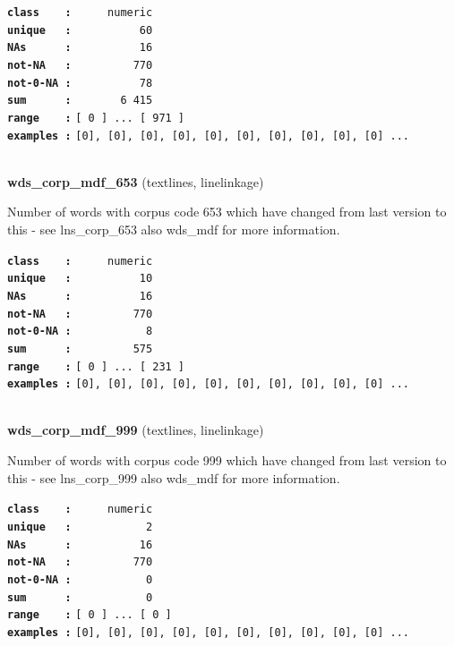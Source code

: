 \documentclass[]{article}
\begin{document}
\textbf{\texttt{class\ \ \ \ :}} \texttt{~~~~~numeric}\\
\textbf{\texttt{unique\ \ \ :}} \texttt{~~~~~~~~~~60}\\
\textbf{\texttt{NAs\ \ \ \ \ \ :}} \texttt{~~~~~~~~~~16}\\
\textbf{\texttt{not-NA\ \ \ :}} \texttt{~~~~~~~~~770}\\
\textbf{\texttt{not-0-NA\ :}} \texttt{~~~~~~~~~~78}\\
\textbf{\texttt{sum\ \ \ \ \ \ :}} \texttt{~~~~~~~6~415}\\
\textbf{\texttt{range\ \ \ \ :}}
\texttt{{[}\ 0\ {]}\ ...\ {[}\ 971\ {]}}\\
\textbf{\texttt{examples\ :}}
\texttt{{[}0{]},\ {[}0{]},\ {[}0{]},\ {[}0{]},\ {[}0{]},\ {[}0{]},\ {[}0{]},\ {[}0{]},\ {[}0{]},\ {[}0{]}\ ...}\\

~

\textbf{wds\_corp\_mdf\_653} (textlines, linelinkage)

Number of words with corpus code 653 which have changed from last
version to this - see lns\_corp\_653 also wds\_mdf for more information.

\textbf{\texttt{class\ \ \ \ :}} \texttt{~~~~~numeric}\\
\textbf{\texttt{unique\ \ \ :}} \texttt{~~~~~~~~~~10}\\
\textbf{\texttt{NAs\ \ \ \ \ \ :}} \texttt{~~~~~~~~~~16}\\
\textbf{\texttt{not-NA\ \ \ :}} \texttt{~~~~~~~~~770}\\
\textbf{\texttt{not-0-NA\ :}} \texttt{~~~~~~~~~~~8}\\
\textbf{\texttt{sum\ \ \ \ \ \ :}} \texttt{~~~~~~~~~575}\\
\textbf{\texttt{range\ \ \ \ :}}
\texttt{{[}\ 0\ {]}\ ...\ {[}\ 231\ {]}}\\
\textbf{\texttt{examples\ :}}
\texttt{{[}0{]},\ {[}0{]},\ {[}0{]},\ {[}0{]},\ {[}0{]},\ {[}0{]},\ {[}0{]},\ {[}0{]},\ {[}0{]},\ {[}0{]}\ ...}\\

~

\textbf{wds\_corp\_mdf\_999} (textlines, linelinkage)

Number of words with corpus code 999 which have changed from last
version to this - see lns\_corp\_999 also wds\_mdf for more information.

\textbf{\texttt{class\ \ \ \ :}} \texttt{~~~~~numeric}\\
\textbf{\texttt{unique\ \ \ :}} \texttt{~~~~~~~~~~~2}\\
\textbf{\texttt{NAs\ \ \ \ \ \ :}} \texttt{~~~~~~~~~~16}\\
\textbf{\texttt{not-NA\ \ \ :}} \texttt{~~~~~~~~~770}\\
\textbf{\texttt{not-0-NA\ :}} \texttt{~~~~~~~~~~~0}\\
\textbf{\texttt{sum\ \ \ \ \ \ :}} \texttt{~~~~~~~~~~~0}\\
\textbf{\texttt{range\ \ \ \ :}}
\texttt{{[}\ 0\ {]}\ ...\ {[}\ 0\ {]}}\\
\textbf{\texttt{examples\ :}}
\texttt{{[}0{]},\ {[}0{]},\ {[}0{]},\ {[}0{]},\ {[}0{]},\ {[}0{]},\ {[}0{]},\ {[}0{]},\ {[}0{]},\ {[}0{]}\ ...}\\
\end{document}
